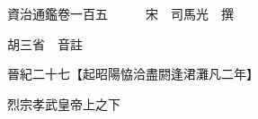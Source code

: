 










 


 
 


 

  
  
  
  
  





  
  
  
  
  
 
  

  

  
  
  



  

 
 

  
   




  

  
  


  　　資治通鑑卷一百五　　　宋　司馬光　撰

　　胡三省　音註

　　晉紀二十七【起昭陽恊洽盡閼逢涒灘凡二年】

　　烈宗孝武皇帝上之下

